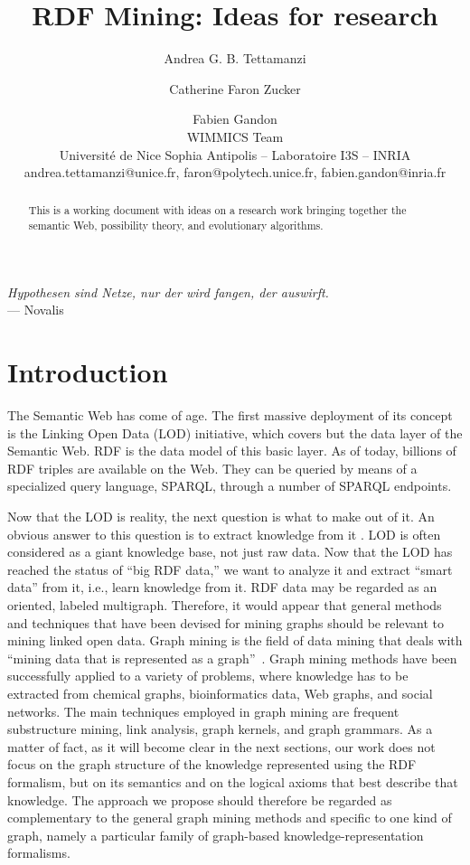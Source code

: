 \documentclass[a4paper]{article}
\title{RDF Mining: Ideas for research}
\author{Andrea G. B. Tettamanzi \and Catherine Faron Zucker \and Fabien Gandon\\
  WIMMICS Team\\
  Universit\'e de Nice Sophia Antipolis -- Laboratoire I3S -- INRIA\\
  andrea.tettamanzi@unice.fr, faron@polytech.unice.fr, fabien.gandon@inria.fr}
\newcounter{ex}
\begin{document}
  \maketitle

\begin{abstract}
  This is a working document with ideas on a research work bringing together
  the semantic Web, possibility theory, and evolutionary algorithms.
\end{abstract}

\begin{flushright}
  \textit{Hypothesen sind Netze, nur der wird fangen, der auswirft.}\\
--- Novalis
\end{flushright}

\section{Introduction}

The Semantic Web has come of age.
The first massive deployment of its concept is the Linking Open Data (LOD) initiative,
which covers but the data layer of the Semantic Web.
RDF is the data model of this basic layer.
As of today, billions of RDF triples are available on the Web. They can be queried
by means of a specialized query language, SPARQL, through a number of SPARQL endpoints.

Now that the LOD is reality, the next question is what to make out of it.
An obvious answer to this question is to extract knowledge from it \cite{AuerLehmann2010swj}.
LOD is often considered as a giant knowledge base, not just raw data.
Now that the LOD has reached the status of ``big RDF data,'' we want to analyze
it and extract ``smart data'' from it, i.e., learn knowledge from it.
RDF data may be regarded as an oriented, labeled multigraph.
Therefore, it would appear that general methods and techniques that have been devised
for mining graphs should be relevant to mining linked open data.
Graph mining is the field of data mining that deals with
``mining data that is represented as a graph''~\cite{CookHolder2006}.
Graph mining methods have been successfully applied to a variety of problems, where
knowledge has to be extracted from chemical graphs, bioinformatics data,
Web graphs, and social networks. The main techniques employed in graph mining
are frequent substructure mining, link analysis, graph kernels, and graph grammars.
As a matter of fact, as it will become clear in the next sections,
our work does not focus on the graph structure of the knowledge represented using
the RDF formalism, but on its semantics and on the logical axioms that best describe
that knowledge. The approach we propose should therefore be regarded as complementary
to the general graph mining methods and specific to one kind of graph, namely
a particular family of graph-based knowledge-representation formalisms.
\end{document}

